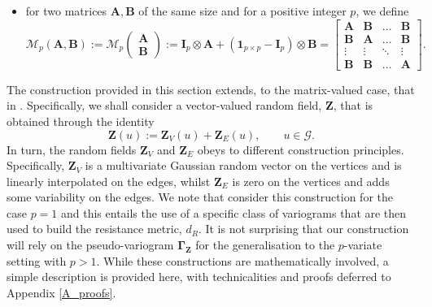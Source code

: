 \documentclass[12pt]{article}
\theoremstyle{plain}
\theoremstyle{remark}
\newcommand{\round}[1]{\left( #1 \right)}
\newcommand{\Mv}[3]{\mathcal{M}_{#1}\begin{pmatrix}
	#2\\
	#3
\end{pmatrix}}
\newcommand{\Mh}[3]{\mathcal{M}_{#1}\round{#2,#3}}
\newcommand{\onepp}[0]{{\mathbf{1}_{p\times p}}}
\newcommand{\latMatr}[1]{\mathbf{#1}}          %
\newcommand{\grMatr}[1]{{\boldsymbol{#1}}}   %
\newcommand{\rVec}[1]{{\bm{#1}}}            %
\DeclareMathOperator{\diag}{diag}
\begin{document}
\begin{itemize}
    \item for two matrices ${\latMatr{A}},{\latMatr{B}}$ {of the same size} and for a positive integer $p$, we define
    \begin{equation}
        \label{eq:notationM}
        \Mh{p}{{\latMatr{A}}}{{\latMatr{B}}}:=\Mv{p}{{\latMatr{A}}}{{\latMatr{B}}}:={\latMatr{I}}_p \otimes {\latMatr{A}} + (\onepp - {\latMatr{I}}_p) \otimes {\latMatr{B}} = \begin{bmatrix}
            {\latMatr{A}} & {\latMatr{B}} & \dots & {\latMatr{B}}\\
            {\latMatr{B}} & {\latMatr{A}} & \dots & {\latMatr{B}}\\
            \vdots & \vdots & \ddots & \vdots\\
            {\latMatr{B}} & {\latMatr{B}} & \dots & {\latMatr{A}}
        \end{bmatrix}.
    \end{equation}
\end{itemize}

The construction provided in this section extends, to the matrix-valued case, that in \cite{anderes_isotropic_2020}. Specifically, we shall consider a vector-valued random field, $\rVec{Z}$, that is obtained through the identity 
\begin{equation}
    \label{eq:multivariate_random_field_Z}
    \rVec{Z}(u) := \rVec{Z}_{V}(u) + \rVec{Z}_{E}(u), \qquad u \in \mathcal G.
\end{equation}
In turn, the {random fields} $\rVec{Z}_{V}$ and $\rVec{Z}_{E}$ obeys to different construction principles. Specifically, $\rVec{Z}_V$ is a multivariate Gaussian random vector on the vertices and is linearly interpolated on the edges, whilst $\rVec{Z}_E$ is zero on the vertices and adds some variability on the edges. We note that \cite{anderes_isotropic_2020} consider this construction for the case $p=1$ and this entails the use of a specific class of variograms that are then used to build the resistance metric, $d_R$. It is not surprising that our construction will rely on the pseudo-variogram $\grMatr \Gamma_{\rVec{Z}}$ {for the generalisation to the $p$-variate setting with $p>1$}. While these constructions are mathematically involved, a simple description is provided here, with technicalities and proofs deferred to Appendix \ref{A_proofs}. \par
\end{document}

